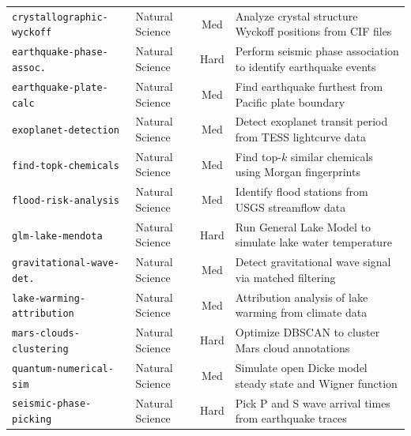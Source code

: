 \begin{longtable}{p{4.5cm}p{2.5cm}cp{7.5cm}}
\texttt{crystallographic-wyckoff} & Natural Science & Med & Analyze crystal structure Wyckoff positions from CIF files \\
\texttt{earthquake-phase-assoc.} & Natural Science & Hard & Perform seismic phase association to identify earthquake events \\
\texttt{earthquake-plate-calc} & Natural Science & Med & Find earthquake furthest from Pacific plate boundary \\
\texttt{exoplanet-detection} & Natural Science & Med & Detect exoplanet transit period from TESS lightcurve data \\
\texttt{find-topk-chemicals} & Natural Science & Med & Find top-$k$ similar chemicals using Morgan fingerprints \\
\texttt{flood-risk-analysis} & Natural Science & Med & Identify flood stations from USGS streamflow data \\
\texttt{glm-lake-mendota} & Natural Science & Hard & Run General Lake Model to simulate lake water temperature \\
\texttt{gravitational-wave-det.} & Natural Science & Med & Detect gravitational wave signal via matched filtering \\
\texttt{lake-warming-attribution} & Natural Science & Med & Attribution analysis of lake warming from climate data \\
\texttt{mars-clouds-clustering} & Natural Science & Hard & Optimize DBSCAN to cluster Mars cloud annotations \\
\texttt{quantum-numerical-sim} & Natural Science & Med & Simulate open Dicke model steady state and Wigner function \\
\texttt{seismic-phase-picking} & Natural Science & Hard & Pick P and S wave arrival times from earthquake traces \\
\midrule


\end{longtable}
